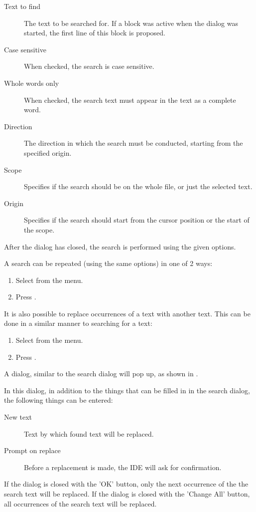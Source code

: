 
\begin{description}
\item[Text to find] The text to be searched for. If a block was active when
the dialog was started, the first line of this block is proposed.
\item[Case sensitive] When checked, the search is case sensitive.
\item[Whole words only] When checked, the search text must appear in the
text as a complete word.
\item[Direction] The direction in which the search must be conducted,
starting from the specified origin.
\item[Scope] Specifies if the search should be on the whole file, or just the selected
text.
\item[Origin] Specifies if the search should start from the cursor position or the start
of the scope.
\end{description}
After the dialog has closed, the search is performed using the given options.

A search can be repeated (using the same options) in one of 2 ways:
\begin{enumerate}
\item Select  from the menu.
\item Press .
\end{enumerate}

It is also possible to replace occurrences of a text with another text. 
This can be done in a similar manner to searching for a text:
\begin{enumerate}
\item Select  from the menu.
\item Press .
\end{enumerate}
A dialog, similar to the search dialog will pop up, as shown in .


In this dialog, in addition to the things that can be filled in in the
search dialog, the following things can be entered:
\begin{description}
\item [New text] Text by which found text will be replaced.
\item [Prompt on replace] Before a replacement is made, the IDE will ask for
confirmation.
\end{description}
If the dialog is closed with the 'OK' button, only the next occurrence of
the the search text will be replaced. 
If the dialog is closed with the 'Change All' button, all occurrences of 
the search text will be replaced.

